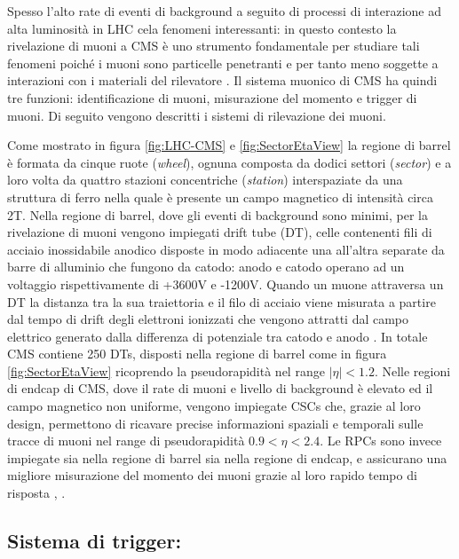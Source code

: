 Spesso l'alto rate di eventi di background a seguito di processi di interazione ad alta luminosità in LHC cela fenomeni interessanti: in questo contesto la rivelazione di muoni a CMS è uno strumento fondamentale per studiare tali fenomeni poiché i muoni sono particelle penetranti e per tanto meno soggette a interazioni con i materiali del rilevatore \cite{cms2008cms}. Il sistema muonico di CMS ha quindi tre funzioni: identificazione di muoni, misurazione del momento e trigger di muoni. Di seguito vengono descritti i sistemi di rilevazione dei muoni.


Come mostrato in figura \ref{fig:LHC-CMS} e \ref{fig:SectorEtaView} la regione di barrel è formata da cinque ruote (\textit{wheel}), ognuna composta da dodici settori (\textit{sector}) e a loro volta da quattro stazioni concentriche (\textit{station}) interspaziate da una struttura di ferro nella quale è presente un campo magnetico di intensità circa 2T. Nella regione di barrel, dove gli eventi di background sono minimi, per la rivelazione di muoni vengono impiegati drift tube (DT), celle contenenti fili di acciaio inossidabile anodico disposte in modo adiacente una all'altra separate da barre di alluminio che fungono da catodo: anodo e catodo operano ad un voltaggio rispettivamente di +3600V e -1200V. Quando un muone attraversa un DT la distanza tra la sua traiettoria e il filo di acciaio viene misurata a partire dal tempo di drift degli elettroni ionizzati che vengono attratti dal campo elettrico generato dalla differenza di potenziale tra catodo e anodo \cite{MasterThesisNicLai}. \newline
In totale CMS contiene 250 DTs, disposti nella regione di barrel come in figura \ref{fig:SectorEtaView} ricoprendo la pseudorapidità nel range $|\eta| < 1.2$. \newline
Nelle regioni di endcap di CMS, dove il rate di muoni e livello di background è elevato ed il campo magnetico non uniforme, vengono impiegate CSCs che, grazie al loro design, permettono di ricavare precise informazioni spaziali e temporali sulle tracce di muoni nel range di pseudorapidità $0.9 < \eta < 2.4$. Le RPCs sono invece impiegate sia nella regione di barrel sia nella regione di endcap, e assicurano una migliore misurazione del momento dei muoni grazie al loro rapido tempo di risposta \cite{MasterThesisNicLai}, \cite{cms2008cms}.


\subsection{Sistema di trigger:}
\label{sec:SistemaDiTrigger}

